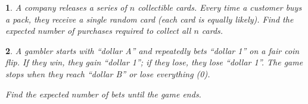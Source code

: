 \documentclass[%
addpoints]{exam}
\theoremstyle{problem}
\newtheorem{p}{}
\begin{document}
\begin{p}
A company releases a series of $n$ collectible cards. Every time a customer buys a pack, they receive a single random card (each card is equally likely). Find the expected number of purchases required to collect all $n$ cards.
\hfill\end{p}

\begin{p}
A gambler starts with ``dollar A'' and repeatedly bets ``dollar 1'' on a fair coin flip. If they win, they gain ``dollar 1''; if they lose, they lose ``dollar 1''. The game stops when they reach ``dollar B'' or lose everything (0). 

Find the expected number of bets until the game ends.
\hfill\end{p}

\end{document}

